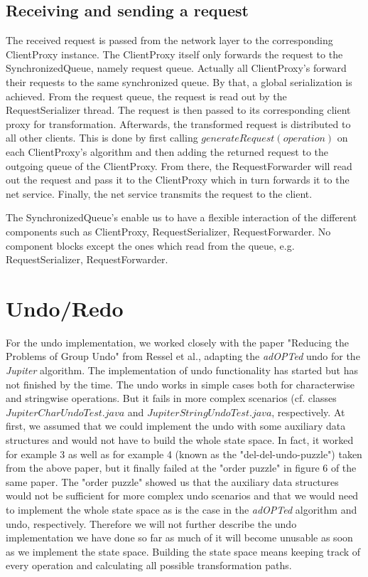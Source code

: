\subsection{Receiving and sending a request}
The received request is passed from the network layer to the corresponding ClientProxy instance. The ClientProxy itself only forwards the request to the SynchronizedQueue, namely request queue. Actually all ClientProxy's forward their requests to the same synchronized queue. By that, a global serialization is achieved. From the request queue, the request is read out by the RequestSerializer thread. The request is then passed to its corresponding client proxy for transformation. Afterwards, the transformed request is distributed to all other clients. This is done by first calling $generateRequest(operation)$ on each ClientProxy's algorithm and then adding the returned request to the outgoing queue of the ClientProxy. From there, the RequestForwarder will read out the request and pass it to the ClientProxy which in turn forwards it to the net service. Finally, the net service transmits the request to the client.

The SynchronizedQueue's enable us to have a flexible interaction of the different components such as ClientProxy, RequestSerializer, RequestForwarder. No component blocks except the ones which read from the queue, e.g. RequestSerializer, RequestForwarder.

\section{Undo/Redo}
\label{undo_redo}
For the undo implementation, we worked closely with the paper "Reducing the Problems of Group Undo" from Ressel et al., adapting the \emph{adOPTed} undo for the \emph{Jupiter} algorithm. 
The implementation of undo functionality has started but has not finished by the time. The undo works in simple cases both for characterwise and stringwise operations. But it fails in more complex scenarios (cf. classes $JupiterCharUndoTest.java$ and $JupiterStringUndoTest.java$, respectively. At first, we assumed that we could implement the undo with some auxiliary data structures and would not have to build the whole state space. In fact, it worked for example 3 as well as for example 4 (known as the "del-del-undo-puzzle") taken from the above paper, but it finally failed at the "order puzzle" in figure 6 of the same paper. The "order puzzle" showed us that the auxiliary data structures would not be sufficient for more complex undo scenarios and that we would need to implement the whole state space as is the case in the \emph{adOPTed} algorithm and undo, respectively. 
Therefore we will not further describe the undo implementation we have done so far as much of it will become unusable as soon as we implement the state space. Building the state space means keeping track of every operation and calculating all possible transformation paths.

